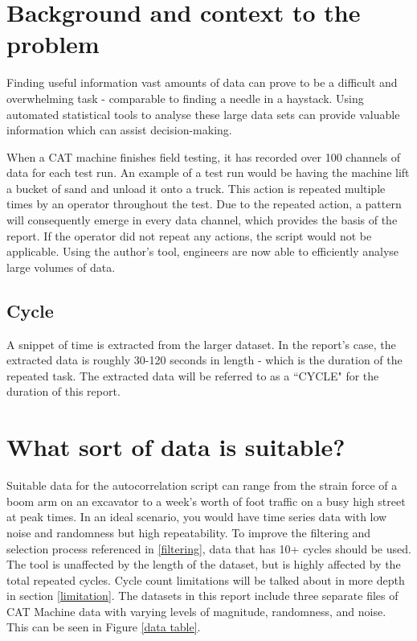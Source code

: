 \raggedright
\section{Background and context to the problem}
Finding useful information vast amounts of data can prove to be a difficult and overwhelming task - comparable to finding a needle in a haystack. Using automated statistical tools to analyse these large data sets can provide valuable information which can assist decision-making. 

When a CAT machine finishes field testing, it has recorded over 100 channels of data for each test run. An example of a test run would be having the machine lift a bucket of sand and unload it onto a truck. This action is repeated multiple times by an operator throughout the test. Due to the repeated action, a pattern will consequently emerge in every data channel, which provides the basis of the report. If the operator did not repeat any actions, the script would not be applicable. Using the author's tool, engineers are now able to efficiently analyse large volumes of data. 


\subsection{Cycle}
A snippet of time is extracted from the larger dataset. In the report's case, the extracted data is roughly 30-120 seconds in length - which is the duration of the repeated task. The extracted data will be referred to as a ``CYCLE" for the duration of this report. 

\section{What sort of data is suitable?}
Suitable data for the autocorrelation script can range from the strain force of a boom arm on an excavator to a week's worth of foot traffic on a busy high street at peak times.  In an ideal scenario, you would have time series data with low noise and randomness but high repeatability. To improve the filtering and selection process referenced in \ref{filtering}, data that has 10+ cycles should be used. The tool is unaffected by the length of the dataset, but is highly affected by the total repeated cycles. Cycle count limitations will be talked about in more depth in section \ref{limitation}. The datasets in this report include three separate files of CAT Machine data with varying levels of magnitude, randomness, and noise. This can be seen in Figure \ref{data table}. 

